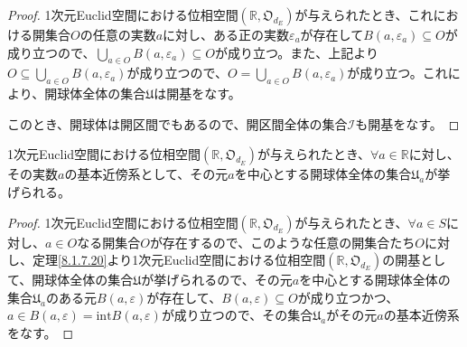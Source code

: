 \documentclass[dvipdfmx]{jsarticle}
\begin{document}
\begin{proof}
1次元Euclid空間における位相空間$\left( \mathbb{R},\mathfrak{O}_{d_{E}} \right)$が与えられたとき、これにおける開集合$O$の任意の実数$a$に対し、ある正の実数$\varepsilon_{a}$が存在して$B\left( a,\varepsilon_{a} \right) \subseteq O$が成り立つので、$\bigcup_{a \in O} {B\left( a,\varepsilon_{a} \right)} \subseteq O$が成り立つ。また、上記より$O \subseteq \bigcup_{a \in O} {B\left( a,\varepsilon_{a} \right)}$が成り立つので、$O = \bigcup_{a \in O} {B\left( a,\varepsilon_{a} \right)}$が成り立つ。これにより、開球体全体の集合$\mathfrak{U}$は開基をなす。\par
このとき、開球体は開区間でもあるので、開区間全体の集合$\mathcal{I}$も開基をなす。
\end{proof}
\begin{thm}\label{8.1.7.21}
1次元Euclid空間における位相空間$\left( \mathbb{R},\mathfrak{O}_{d_{E}} \right)$が与えられたとき、$\forall a \in \mathbb{R}$に対し、その実数$a$の基本近傍系として、その元$a$を中心とする開球体全体の集合$\mathfrak{U}_{a}$が挙げられる。
\end{thm}
\begin{proof}
1次元Euclid空間における位相空間$\left( \mathbb{R},\mathfrak{O}_{d_{E}} \right)$が与えられたとき、$\forall a \in S$に対し、$a \in O$なる開集合$O$が存在するので、このような任意の開集合たち$O$に対し、定理\ref{8.1.7.20}より1次元Euclid空間における位相空間$\left( \mathbb{R},\mathfrak{O}_{d_{E}} \right)$の開基として、開球体全体の集合$\mathfrak{U}$が挙げられるので、その元$a$を中心とする開球体全体の集合$\mathfrak{U}_{a}$のある元$B(a,\varepsilon)$が存在して、$B(a,\varepsilon) \subseteq O$が成り立つかつ、$a \in B(a,\varepsilon) = {\mathrm{int}}{B(a,\varepsilon)}$が成り立つので、その集合$\mathfrak{U}_{a}$がその元$a$の基本近傍系をなす。
\end{proof}
\end{document}
